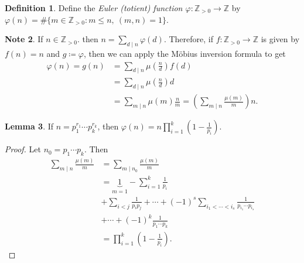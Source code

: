 \documentclass[10pt,letterpaper,cm]{nupset}
\theoremstyle{definition}
\newtheorem{definition}{Definition}[subsection]
\newtheorem{note}[definition]{Note}
\theoremstyle{theorem}
\newtheorem{lemma}[definition]{Lemma}
\theoremstyle{remark}
\newcommand{\Z}{\mathbb Z}
\newcommand{\1}{\mathbf{1}}
\newcommand{\0}{\vec 0}
\begin{document}
\begin{definition}
Define the \textit{Euler (totient) function $\varphi : \Z_{>0}\to \Z$} by $\varphi(n)= \#\{m\in \Z_{>0} : m\leq  n, \ (m,n)=1\}$.
\end{definition}

\begin{note}
If $n\in \Z_{>0}$. then $n=\sum_{d\mid n}\varphi(d)$. Therefore, if $f: \Z_{>0} \to \Z$ is given by $f(n) =n$ and $g\coloneqq \varphi$, then we can apply the M\"{o}bius inversion formula to get 
\begin{align*}
 \varphi(n)  = g(n) & = \sum_{d\mid n} \mu \left(\frac{n}{d} \right)f(d)
 \\ & =  \sum_{d\mid n} \mu \left(\frac{n}{d} \right)d
 \\ & = \sum_{m \mid n} \mu(m)\frac{n}{m} =  \left( \sum_{m \mid n} \frac{\mu(m)}{m}\right) n
. \end{align*}
\end{note}

\begin{lemma}
If $n= p_1^{r_1} \cdots p_k^{r_k}$, then $\varphi(n) =n\prod_{i=1}^k \left(1- \frac{1}{p_i} \right)$.
\end{lemma}
\begin{proof}
Let $n_0 = p_1 \cdots p_k$. Then
\begin{align*}
\sum_{m\mid n}\frac{\mu(m)}{m} & = \sum_{m\mid n_0}\frac{\mu(m)}{m}
\\ & = \underbrace{1}_{m=1} -\sum_{i=1}^k \frac{1}{p_i}
\\ & + \sum_{i<j}\frac{1}{p_ip_j} +\cdots + ({-}1)^s \sum_{i_1 < \cdots < i_s}\frac{1}{p_{i_1}\cdots p_{i_s}}
\\ & + \cdots  +({-}1)^k\frac{1}{p_1\cdots p_k}
\\ & = \prod_{i=1}^k \left(1- \frac{1}{p_i}\right).
\end{align*}
\end{proof}
\end{document}

